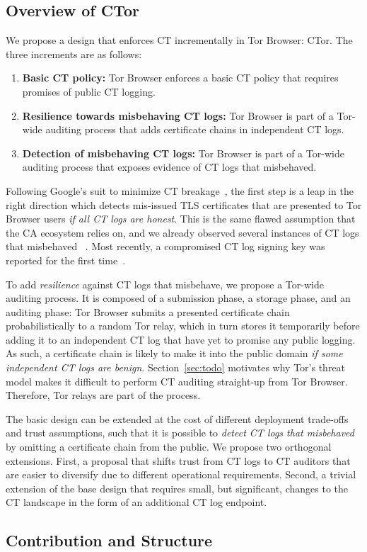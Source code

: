 \subsection{Overview of CTor}
We propose a design that enforces CT incrementally in Tor Browser: CTor.  The
three increments are as follows:
\begin{enumerate}
	\item \textbf{Basic CT policy:}
		Tor Browser enforces a basic CT policy that requires promises of public
		CT logging.
	\item \textbf{Resilience towards misbehaving CT logs:}
		Tor Browser is part of a Tor-wide auditing process that adds certificate
		chains in independent CT logs.
	\item \textbf{Detection of misbehaving CT logs:}
		Tor Browser is part of a Tor-wide auditing process that exposes evidence
		of CT logs that misbehaved.
\end{enumerate}

Following Google's suit to minimize CT breakage~\cite{does-ct-break-the-web},
the first step is a leap in the right direction which detects mis-issued TLS
certificates that are presented to Tor Browser users \emph{if all CT logs are
honest}.  This is the same flawed assumption that the CA ecosystem relies on,
and we already observed several instances of CT logs that misbehaved~%
	\cite{izenpe-disqualified,venafi-disqualified}.
Most recently, a compromised CT log signing key was reported for the first
time~\cite{digicert-log-compromised}.

To add \emph{resilience} against CT logs that misbehave, we propose a Tor-wide
auditing process.  It is composed of a submission phase, a storage phase, and
an auditing phase:
	Tor Browser submits a presented certificate chain probabilistically to
		a random Tor relay,
	which in turn stores it temporarily before adding it to an independent CT
		log that have yet to promise any public logging.
As such, a certificate chain is likely to make it into the public domain
\emph{if some independent CT logs are benign}.  Section~\ref{sec:todo} motivates
why Tor's threat model makes it difficult to perform CT auditing straight-up
from Tor Browser.  Therefore, Tor relays are part of the process.

The basic design can be extended at the cost of different deployment trade-offs
and trust assumptions, such that it is possible to \emph{detect CT logs that
misbehaved} by omitting a certificate chain from the public.  We propose two
orthogonal extensions.  First, a proposal that shifts trust from CT logs to CT
auditors that are easier to diversify due to different operational
requirements.  Second, a trivial extension of the base design that requires
small, but significant, changes to the CT landscape in the form of an
additional CT log endpoint.

\subsection{Contribution and Structure}
